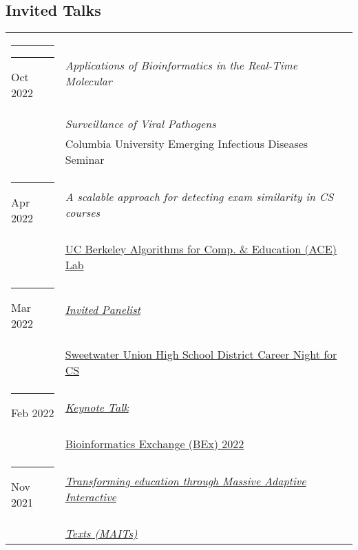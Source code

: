 \documentclass[margin,line]{res}
\begin{document}
\begin{resume}
\section{\sc Invited Talks}
\begin{longtable}{@{}p{0.7in}p{4in}}\rule{-1mm}{4.5mm}
\hspace*{-4mm} \rule{-1mm}{5mm} Oct 2022 & \textit{Applications of Bioinformatics in the Real-Time Molecular}\\*
\hspace*{-4mm} & \hspace{4mm} \textit{Surveillance of Viral Pathogens}\\*
\hspace*{-4mm} & \hspace{4mm} Columbia University Emerging Infectious Diseases Seminar\\
\hspace*{-4mm} \rule{-1mm}{5mm} Apr 2022 & \textit{A scalable approach for detecting exam similarity in CS courses}\\*
\hspace*{-4mm} & \hspace{4mm} \href{https://acelab.berkeley.edu/}{UC Berkeley Algorithms for Comp. \& Education (ACE) Lab}\\
\hspace*{-4mm} \rule{-1mm}{5mm} Mar 2022 & \href{http://www.sweetwaterschools.org/}{\textit{Invited Panelist}}\\*
\hspace*{-4mm} & \hspace{4mm} \href{http://www.sweetwaterschools.org/}{Sweetwater Union High School District Career Night for CS}\\
\hspace*{-4mm} \rule{-1mm}{5mm} Feb 2022 & \href{https://bioinformatics.ucsd.edu/node/138}{\textit{Keynote Talk}}\\*
\hspace*{-4mm} & \hspace{4mm} \href{https://bioinformatics.ucsd.edu/node/138}{Bioinformatics Exchange (BEx) 2022}\\
\hspace*{-4mm} \rule{-1mm}{5mm} Nov 2021 & \href{https://www.youtube.com/watch?v=EPU_nv-yb_w&t=8206s}{\textit{Transforming education through Massive Adaptive Interactive}}\\*
\hspace*{-4mm} & \hspace{4mm} \href{https://www.youtube.com/watch?v=EPU_nv-yb_w&t=8206s}{\textit{Texts (MAITs)}}\\*

\end{longtable}
\end{resume}
\end{document}
